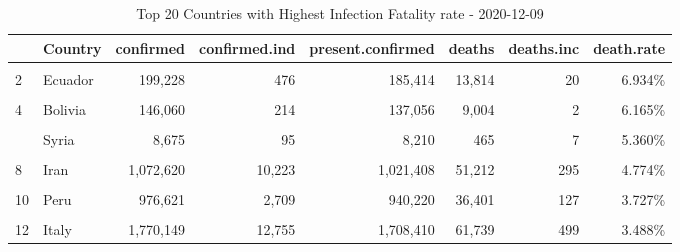 \begin{table}[!h]
\caption{\label{tab:}Top 20 Countries with Highest Infection Fatality rate - 2020-12-09}
\centering
\fontsize{7}{9}\selectfont
\begin{tabular}[t]{llrrrrrr}
\toprule
  & Country & confirmed & confirmed.ind & present.confirmed & deaths & deaths.inc & death.rate\\
\midrule
\cellcolor{gray!6}{1} & \cellcolor{gray!6}{Mexico} & \cellcolor{gray!6}{1,205,229} & \cellcolor{gray!6}{11,974} & \cellcolor{gray!6}{1,093,574} & \cellcolor{gray!6}{111,655} & \cellcolor{gray!6}{781} & \cellcolor{gray!6}{9.264\%}\\
2 & Ecuador & 199,228 & 476 & 185,414 & 13,814 & 20 & 6.934\%\\
\cellcolor{gray!6}{3} & \cellcolor{gray!6}{Sudan} & \cellcolor{gray!6}{20,084} & \cellcolor{gray!6}{337} & \cellcolor{gray!6}{18,777} & \cellcolor{gray!6}{1,307} & \cellcolor{gray!6}{6} & \cellcolor{gray!6}{6.508\%}\\
4 & Bolivia & 146,060 & 214 & 137,056 & 9,004 & 2 & 6.165\%\\
\cellcolor{gray!6}{5} & \cellcolor{gray!6}{Egypt} & \cellcolor{gray!6}{119,702} & \cellcolor{gray!6}{421} & \cellcolor{gray!6}{112,870} & \cellcolor{gray!6}{6,832} & \cellcolor{gray!6}{19} & \cellcolor{gray!6}{5.708\%}\\
\addlinespace
6 & Syria & 8,675 & 95 & 8,210 & 465 & 7 & 5.360\%\\
\cellcolor{gray!6}{7} & \cellcolor{gray!6}{China} & \cellcolor{gray!6}{93,898} & \cellcolor{gray!6}{116} & \cellcolor{gray!6}{89,150} & \cellcolor{gray!6}{4,748} & \cellcolor{gray!6}{2} & \cellcolor{gray!6}{5.057\%}\\
8 & Iran & 1,072,620 & 10,223 & 1,021,408 & 51,212 & 295 & 4.774\%\\
\cellcolor{gray!6}{9} & \cellcolor{gray!6}{Afghanistan} & \cellcolor{gray!6}{47,851} & \cellcolor{gray!6}{135} & \cellcolor{gray!6}{45,932} & \cellcolor{gray!6}{1,919} & \cellcolor{gray!6}{13} & \cellcolor{gray!6}{4.010\%}\\
10 & Peru & 976,621 & 2,709 & 940,220 & 36,401 & 127 & 3.727\%\\
\addlinespace
\cellcolor{gray!6}{11} & \cellcolor{gray!6}{United Kingdom} & \cellcolor{gray!6}{1,771,545} & \cellcolor{gray!6}{16,634} & \cellcolor{gray!6}{1,708,882} & \cellcolor{gray!6}{62,663} & \cellcolor{gray!6}{533} & \cellcolor{gray!6}{3.537\%}\\
12 & Italy & 1,770,149 & 12,755 & 1,708,410 & 61,739 & 499 & 3.488\%\\

\end{tabular}
\end{table}
